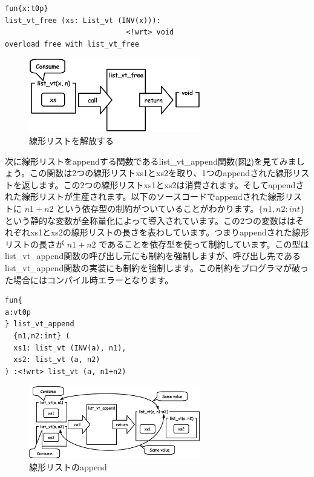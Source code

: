 \documentclass{ipsjprosym}
\begin{document}
\vspace{3mm}
\begin{verbatim}
fun{x:t0p}
list_vt_free (xs: List_vt (INV(x))):
                            <!wrt> void
overload free with list_vt_free
\end{verbatim}
\vspace{3mm}

\begin{figure}[h]
\centering
\includegraphics[width=75mm]{draw/list_vt_free.eps}
\caption{線形リストを解放する}
\label{fig:list_vt_free}
\end{figure}


次に線形リストをappendする関数であるlist\_vt\_append関数(図\ref{fig:list_vt_append})を見てみましょう。この関数は2つの線形リストxs1とxs2を取り、1つのappendされた線形リストを返します。この2つの線形リストxs1とxs2は消費されます。そしてappendされた線形リストが生産されます。以下のソースコードでappendされた線形リストに $n1+n2$ という依存型の制約がついていることがわかります。$\{n1,n2:int\}$ という静的な変数が全称量化によって導入されています。この2つの変数ははそれぞれxs1とxs2の線形リストの長さを表わしています。つまりappendされた線形リストの長さが $n1+n2$ であることを依存型を使って制約しています。この型はlist\_vt\_append関数の呼び出し元にも制約を強制しますが、呼び出し先であるlist\_vt\_append関数の実装にも制約を強制します。この制約をプログラマが破った場合にはコンパイル時エラーとなります。

\vspace{3mm}
\begin{verbatim}
fun{
a:vt0p
} list_vt_append
  {n1,n2:int} (
  xs1: list_vt (INV(a), n1),
  xs2: list_vt (a, n2)
) :<!wrt> list_vt (a, n1+n2)
\end{verbatim}
\vspace{3mm}

\begin{figure}[h]
\centering
\includegraphics[width=75mm]{draw/list_vt_append.eps}
\caption{線形リストのappend}
\label{fig:list_vt_append}
\end{figure}
\end{document}

